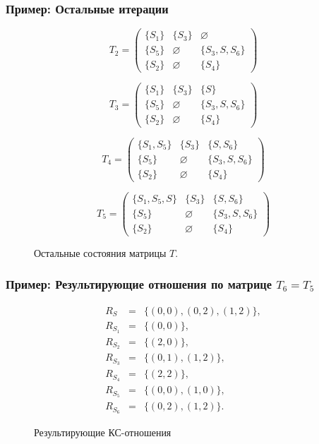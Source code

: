 \documentclass{beamer}
\begin{document}
\begin{frame}[fragile]
	\transwipe[direction=90]
	\frametitle{Пример: Остальные итерации}
\begin{figure}[h]
\[
T_2 = \begin{pmatrix}
    \{S_1\} & \{S_3\} & \varnothing \\ \{S_5\} & \varnothing & \{S_3, S, S_6\} \\ \{S_2\} & \varnothing & \{S_4\}
\end{pmatrix}
\]

\[
T_3 = \begin{pmatrix}
    \{S_1\} & \{S_3\} & \{S\} \\ \{S_5\} & \varnothing & \{S_3, S, S_6\} \\ \{S_2\} & \varnothing & \{S_4\}
\end{pmatrix}
\]

\[
T_4 = \begin{pmatrix}
    \{S_1, S_5\} & \{S_3\} & \{S, S_6\} \\ \{S_5\} & \varnothing & \{S_3, S, S_6\} \\ \{S_2\} & \varnothing & \{S_4\}
\end{pmatrix}
\]

\[
T_5 = \begin{pmatrix}
    \{S_1, S_5, S\} & \{S_3\} & \{S, S_6\} \\ \{S_5\} & \varnothing & \{S_3, S, S_6\} \\ \{S_2\} & \varnothing & \{S_4\}
\end{pmatrix}
\]
\caption{Остальные состояния матрицы $T$.}
\label{ExampleQueryFinalIterations}
\end{figure}
\end{frame}

\begin{frame}[fragile]
	\transwipe[direction=90]
	\frametitle{Пример: Результирующие отношения по матрице $T_6 = T_5$}
\begin{figure}[h]
\begin{eqnarray*}
R_S&=&\{(0,0),(0,2),(1,2)\},\\
R_{S_1}&=&\{(0,0)\},\\
R_{S_2}&=&\{(2,0)\}, \\
R_{S_3}&=&\{(0,1), (1,2)\}, \\
R_{S_4}&=&\{(2,2)\}, \\
R_{S_5}&=&\{(0,0), (1,0)\}, \\
R_{S_6}&=&\{(0,2), (1,2)\}.
\end{eqnarray*}
\caption{Результирующие КС-отношения}
\label{ExampleQueryCFRelations}
\end{figure}
\end{frame}
\end{document}
